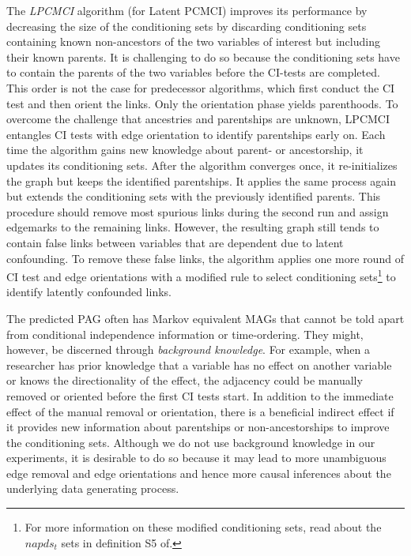 \documentclass[conference]{IEEEtran}
\begin{document}
The \textit{LPCMCI} algorithm (for Latent PCMCI) improves its performance by decreasing the size of the conditioning sets by discarding conditioning sets containing known non-ancestors of the two variables of interest but including their known parents\cite{gerhardus_high-recall_2021}. It is challenging to do so because the conditioning sets have to contain the parents of the two variables before the CI-tests are completed. This order is not the case for predecessor algorithms, which first conduct the CI test and then orient the links. Only the orientation phase yields parenthoods.
To overcome the challenge that ancestries and parentships are unknown, LPCMCI entangles CI tests with edge orientation to identify parentships early on. Each time the algorithm gains new knowledge about parent- or ancestorship, it updates its conditioning sets. After the algorithm converges once, it re-initializes the graph but keeps the identified parentships. 
It applies the same process again but extends the conditioning sets with the previously identified parents.
This procedure should remove most spurious links during the second run and assign edgemarks to the remaining links. 
However, the resulting graph still tends to contain false links between variables that are dependent due to latent confounding. 
To remove these false links, the algorithm applies one more round of CI test and edge orientations with a modified rule to select conditioning sets\footnote{For more information on these modified conditioning sets, read about the $napds_t$ sets in definition S5 of\cite{gerhardus_high-recall_2021}.} 
to identify latently confounded links\cite{gerhardus_high-recall_2021}.

The predicted PAG often has Markov equivalent MAGs that cannot be told apart from conditional independence information or time-ordering. They might, however, be discerned through \textit{background knowledge}. For example, when a researcher has prior knowledge that a variable has no effect on another variable or knows the directionality of the effect, the adjacency could be manually removed or oriented before the first CI tests start. 
In addition to the immediate effect of the manual removal or orientation, there is a beneficial indirect effect if it provides new information about parentships or non-ancestorships to improve the conditioning sets.
Although we do not use background knowledge in our experiments, it is desirable to do so because it may lead to more unambiguous edge removal and edge orientations and hence more causal inferences about the underlying data generating process. 
\end{document}
